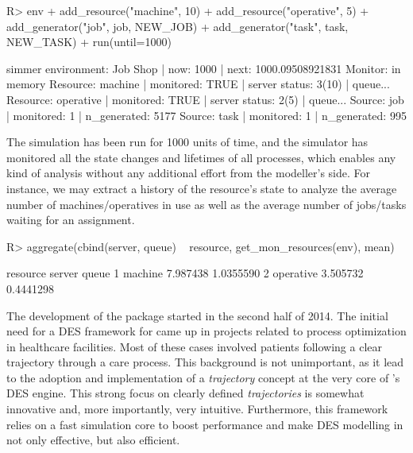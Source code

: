 \documentclass[
  nojss]{jss}
\begin{document}
\begin{CodeChunk}
\begin{CodeInput}
R> env %
+   add_resource("machine", 10) %
+   add_resource("operative", 5) %
+   add_generator("job", job, NEW_JOB) %
+   add_generator("task", task, NEW_TASK) %
+   run(until=1000)
\end{CodeInput}
\begin{CodeOutput}
simmer environment: Job Shop | now: 1000 | next: 1000.09508921831
{ Monitor: in memory }
{ Resource: machine | monitored: TRUE | server status: 3(10) | queue... }
{ Resource: operative | monitored: TRUE | server status: 2(5) | queue... }
{ Source: job | monitored: 1 | n_generated: 5177 }
{ Source: task | monitored: 1 | n_generated: 995 }
\end{CodeOutput}
\end{CodeChunk}

The simulation has been run for 1000 units of time, and the simulator
has monitored all the state changes and lifetimes of all processes,
which enables any kind of analysis without any additional effort from
the modeller's side. For instance, we may extract a history of the
resource's state to analyze the average number of machines/operatives in
use as well as the average number of jobs/tasks waiting for an
assignment.

\begin{CodeChunk}
\begin{CodeInput}
R> aggregate(cbind(server, queue) ~ resource, get_mon_resources(env), mean)
\end{CodeInput}
\begin{CodeOutput}
   resource   server     queue
1   machine 7.987438 1.0355590
2 operative 3.505732 0.4441298
\end{CodeOutput}
\end{CodeChunk}

The development of the  package started in the second half
of 2014. The initial need for a DES framework for  came up
in projects related to process optimization in healthcare facilities.
Most of these cases involved patients following a clear trajectory
through a care process. This background is not unimportant, as it lead
to the adoption and implementation of a \emph{trajectory} concept at the
very core of 's DES engine. This strong focus on clearly
defined \emph{trajectories} is somewhat innovative and, more
importantly, very intuitive. Furthermore, this framework relies on a
fast  simulation core to boost performance and make DES
modelling in  not only effective, but also efficient.
\end{document}
